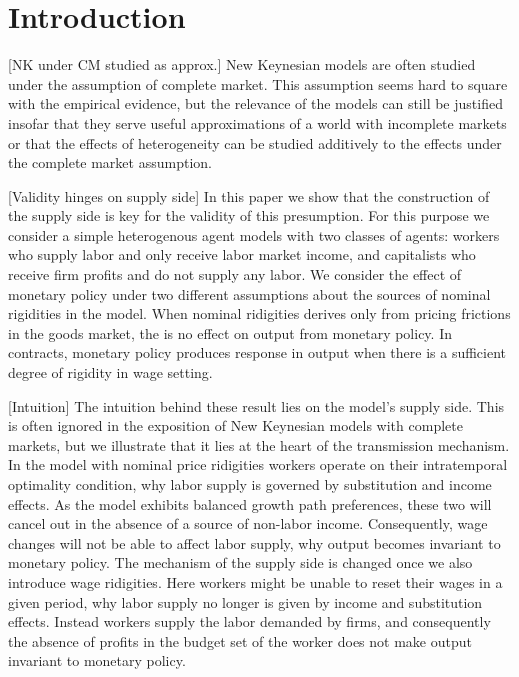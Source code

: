 \section{Introduction}

[NK under CM studied as approx.] New Keynesian models are often studied under the assumption of complete market. This assumption seems hard to square with the empirical evidence, but the relevance of the models can still be justified insofar that they serve useful approximations of a world with incomplete markets or that the effects of heterogeneity can be studied additively to the effects under the complete market assumption. 

[Validity hinges on supply side] In this paper we show that the construction of the supply side is key for the validity of this presumption. For this purpose we consider a simple heterogenous agent models with two classes of agents: workers who supply labor and only receive labor market income, and capitalists who receive firm profits and do not supply any labor. We consider the effect of monetary policy under two different assumptions about the sources of nominal rigidities in the model. When nominal ridigities derives only from pricing frictions in the goods market, the is no effect on output from monetary policy. In contracts, monetary policy produces response in output when there is a sufficient degree of rigidity in wage setting. 

[Intuition] The intuition behind these result lies on the model's supply side. This is often ignored in the exposition of New Keynesian models with complete markets, but we illustrate that it lies at the heart of the transmission mechanism. In the model with nominal price ridigities workers operate on their intratemporal optimality condition, why labor supply is governed by substitution and income effects. As the model exhibits balanced growth path preferences, these two will cancel out in the absence of a source of non-labor income. Consequently, wage changes will not be able to affect labor supply, why output becomes invariant to monetary policy. The mechanism of the supply side is changed once we also introduce wage ridigities. Here workers might be unable to reset their wages in a given period, why labor supply no longer is given by income and substitution effects. Instead workers supply the labor demanded by firms, and consequently the absence of profits in the budget set of the worker does not make output invariant to monetary policy.

